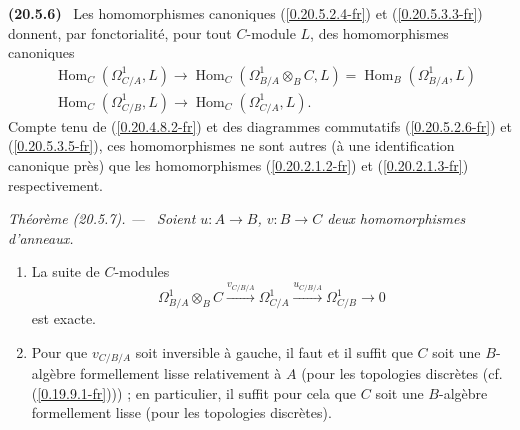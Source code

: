 \documentclass[10pt,oneside]{book}
\makeatletter
\newcommand{\sref}[1]{(\ref{#1})}
\newcommand{\setmanualcurrentlabel}[1]{\def\@currentlabel{#1}}
\newenvironment{env}[1][]{\setmanualcurrentlabel{#1}\par\medskip\noindent\textbf{(#1)}\ }{\par}
\newenvironment{theorem}[1][]{%
  \setmanualcurrentlabel{#1}\par\medskip\noindent\itshape Théorème (#1). ---\ }{\par}
\makeatother
\begin{document}
\begin{env}[20.5.6]
\label{0.20.5.6-fr}
Les homomorphismes canoniques \sref{0.20.5.2.4-fr} et
\sref{0.20.5.3.3-fr} donnent, par fonctorialité, pour tout $C$-module $L$,
des homomorphismes canoniques
\begin{align}
\tag{20.5.6.1}
\label{0.20.5.6.1-fr}
  &\operatorname{Hom}_C(\Omega^1_{C/A},L)
  \to\operatorname{Hom}_C(\Omega^1_{B/A}\otimes_B C,L)
  =\operatorname{Hom}_B(\Omega^1_{B/A},L) \\
\tag{20.5.6.2}
\label{0.20.5.6.2-fr}
  &\operatorname{Hom}_C(\Omega^1_{C/B},L)
  \to\operatorname{Hom}_C(\Omega^1_{C/A},L).
\end{align}
Compte tenu de \sref{0.20.4.8.2-fr} et des diagrammes commutatifs
\sref{0.20.5.2.6-fr} et \sref{0.20.5.3.5-fr}, ces homomorphismes ne sont
autres (à une identification canonique près) que les homomorphismes
\sref{0.20.2.1.2-fr} et \sref{0.20.2.1.3-fr} respectivement.
\end{env}

\begin{theorem}[20.5.7]
\label{0.20.5.7-fr}
Soient $u:A\to B$, $v:B\to C$ deux homomorphismes d'anneaux.
\begin{enumerate}
  \item[\rm(i)] La suite de $C$-modules
\begin{equation}
\tag{20.5.7.1}
\label{0.20.5.7.1-fr}
  \Omega^1_{B/A}\otimes_B C
  \xrightarrow{v_{C/B/A}}\Omega^1_{C/A}
  \xrightarrow{u_{C/B/A}}\Omega^1_{C/B}\to0
\end{equation}
est exacte.
  \item[\rm(ii)] Pour que $v_{C/B/A}$ soit inversible à gauche, il faut et
  il suffit que $C$ soit une $B$-algèbre formellement lisse relativement à
  $A$ (pour les topologies discrètes (cf. \sref{0.19.9.1-fr})) ; en
  particulier, il suffit pour cela que $C$ soit une $B$-algèbre formellement
  lisse (pour les topologies discrètes).
\end{enumerate}
\end{theorem}
\end{document}
